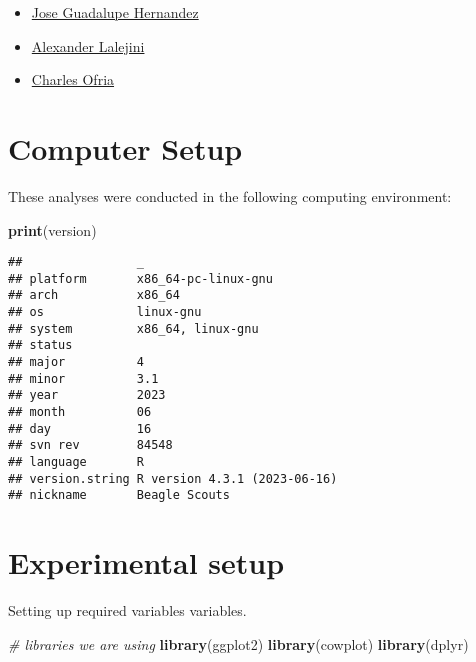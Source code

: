 \documentclass[]{book}
\newenvironment{Shaded}{\begin{snugshade}}{\end{snugshade}}
\newcommand{\CommentTok}[1]{\textcolor[rgb]{0.56,0.35,0.01}{\textit{#1}}}
\newcommand{\KeywordTok}[1]{\textcolor[rgb]{0.13,0.29,0.53}{\textbf{#1}}}
\newcommand{\NormalTok}[1]{#1}
\providecommand{\tightlist}{%
  \setlength{\itemsep}{0pt}\setlength{\parskip}{0pt}}
\begin{document}
\begin{itemize}
\tightlist
\item
  \href{https://jgh9094.github.io/}{Jose Guadalupe Hernandez}
\item
  \href{https://lalejini.com}{Alexander Lalejini}
\item
  \href{http://ofria.com}{Charles Ofria}
\end{itemize}

\hypertarget{computer-setup}{%
\section{Computer Setup}\label{computer-setup}}

These analyses were conducted in the following computing environment:

\begin{Shaded}
\begin{Highlighting}[]
\KeywordTok{print}\NormalTok{(version)}
\end{Highlighting}
\end{Shaded}

\begin{verbatim}
##                _                           
## platform       x86_64-pc-linux-gnu         
## arch           x86_64                      
## os             linux-gnu                   
## system         x86_64, linux-gnu           
## status                                     
## major          4                           
## minor          3.1                         
## year           2023                        
## month          06                          
## day            16                          
## svn rev        84548                       
## language       R                           
## version.string R version 4.3.1 (2023-06-16)
## nickname       Beagle Scouts
\end{verbatim}

\hypertarget{experimental-setup}{%
\section{Experimental setup}\label{experimental-setup}}

Setting up required variables variables.

\begin{Shaded}
\begin{Highlighting}[]
\CommentTok{# libraries we are using}
\KeywordTok{library}\NormalTok{(ggplot2)}
\KeywordTok{library}\NormalTok{(cowplot)}
\KeywordTok{library}\NormalTok{(dplyr)}
\end{Highlighting}
\end{Shaded}
\end{document}
